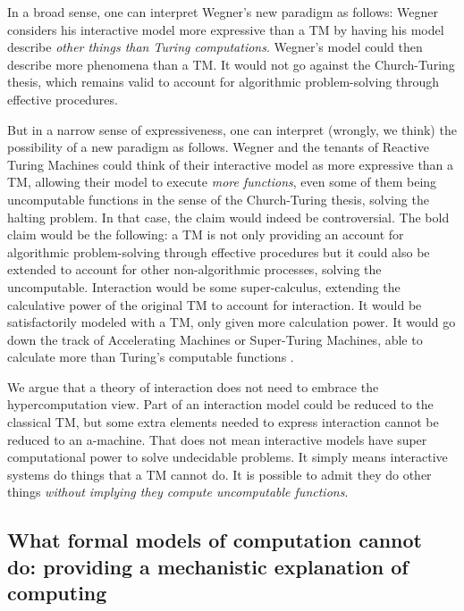 \documentclass[a4paper, 11pt, twoside]{article}
\begin{document}
In a broad sense, one can interpret Wegner's new paradigm as follows: Wegner considers his interactive model more expressive than a TM by having his model describe \textit{other things than Turing computations}. Wegner's model could then describe more phenomena than a TM. 
It would not go against the Church-Turing thesis, which remains valid to account for algorithmic problem-solving through effective procedures.

But in a narrow sense of expressiveness, one can interpret (wrongly, we think) the possibility of a new paradigm as follows. Wegner and the tenants of Reactive Turing Machines could think of their interactive model as more expressive than a TM, allowing their model to execute \textit{more functions}, even some of them being uncomputable functions in the sense of the Church-Turing thesis, solving the halting problem. In that case, the claim would indeed be controversial. The bold claim would be the following: a TM is not only providing an account for algorithmic problem-solving through effective procedures but it could also be extended to account for other non-algorithmic processes, solving the uncomputable. Interaction would be some super-calculus, extending the calculative power of the original TM to account for interaction. It would be satisfactorily modeled with a TM, only given more calculation power. It would go down the track of Accelerating Machines or Super-Turing Machines, able to calculate more than Turing's computable functions \cite{Copeland2002, Copeland2011, MacLennan2009}. 

We argue that a theory of interaction does not need to embrace the hypercomputation view. Part of an interaction model could be reduced to the classical TM, but some extra elements needed to express interaction cannot be reduced to an a-machine. That does not mean interactive models have super computational power to solve undecidable problems. It simply means interactive systems do things that a TM cannot do. It is possible to admit they do other things \textit{without implying they compute uncomputable functions}. 


\subsection{What formal models of computation cannot do: providing a mechanistic explanation of computing}
\end{document}
